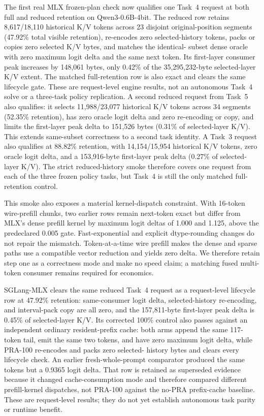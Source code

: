 \documentclass[11pt]{article}
\begin{document}
The first real MLX frozen-plan check now qualifies one Task~4 request at both
full and reduced retention on Qwen3-0.6B-4bit.  The reduced row retains
8,617/18,110 historical K/V tokens across 23 disjoint original-position
segments (47.92\% total visible retention), re-encodes zero selected-history
tokens, packs or copies zero selected K/V bytes, and matches the identical-
subset dense oracle with zero maximum logit delta and the same next token.
Its first-layer consumer peak increases by 148,061 bytes, only 0.42\% of the
35,295,232-byte selected-layer K/V extent.  The matched full-retention row is
also exact and clears the same lifecycle gate.  These are request-level engine
results, not an autonomous Task~4 solve or a three-task policy replication.
A second reduced request from Task~5 also qualifies: it selects
11,988/23,077 historical K/V tokens across 34 segments (52.35\% retention),
has zero oracle logit delta and zero re-encoding or copy, and limits the
first-layer peak delta to 151,526 bytes (0.31\% of selected-layer K/V).  This
extends same-subset correctness to a second task identity.  A Task~3 request
also qualifies at 88.82\% retention, with 14,154/15,954 historical K/V tokens,
zero oracle logit delta, and a 153,916-byte first-layer peak delta (0.27\% of
selected-layer K/V).  The strict reduced-history smoke therefore covers one
request from each of the three frozen policy tasks, but Task~4 is still the
only matched full-retention control.

This smoke also exposes a material kernel-dispatch constraint.  With 16-token
wire-prefill chunks, two earlier rows remain next-token exact but differ from
MLX's dense prefill kernel by maximum logit deltas of 1.000 and 1.125, above
the predeclared 0.005 gate.  Fast-exponential and explicit dtype-rounding
changes do not repair the mismatch.  Token-at-a-time wire prefill makes the
dense and sparse paths use a compatible vector reduction and yields zero
delta.  We therefore retain step one as a correctness mode and make no speed
claim; a matching fused multi-token consumer remains required for economics.

SGLang-MLX clears the same reduced Task~4 request as a request-level lifecycle
row at 47.92\% retention: same-consumer logit delta, selected-history
re-encoding, and interval-pack copy are all zero, and the 157,811-byte
first-layer peak delta is 0.45\% of selected-layer K/V.  Its corrected 100\%
control also passes against an independent ordinary resident-prefix cache:
both arms append the same 117-token tail, emit the same two tokens, and have
zero maximum logit delta, while PRA-100 re-encodes and packs zero selected-
history bytes and clears every lifecycle check.  An earlier fresh-whole-prompt
comparator produced the same tokens but a 0.9365 logit delta.  That row is
retained as superseded evidence because it changed cache-consumption mode and
therefore compared different prefill-kernel dispatches, not PRA-100 against
the no-PRA prefix-cache baseline.  These are request-level results; they do
not yet establish autonomous task parity or runtime benefit.
\end{document}
